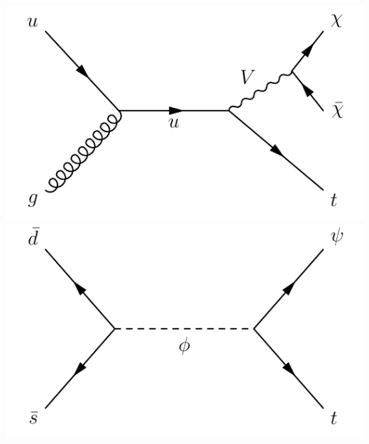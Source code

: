 \documentclass[aspectratio=169,xcolor=dvipsnames,,table,compress]{beamer}
\begin{document}
\begin{frame}[t]
\begin{columns}[T]
\begin{column}{0.35\textwidth}
{        \includegraphics[width=\textwidth]{../figures/monotop/diagrams/fcncb.pdf} \\
        \includegraphics[width=\textwidth]{../figures/monotop/diagrams/resonant.pdf} \\
      }
  \end{column}
  \end{columns}
\end{frame}
\end{document}
